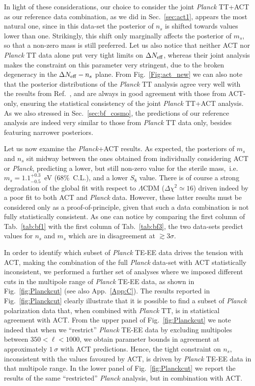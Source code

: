 \documentclass[a4paper,11pt]{article}
\begin{document}
In light of these considerations, our choice to {consider} the joint \emph{Planck} TT+ACT as our reference {data combination}, as we did in Sec.~\ref{sec:act1}, appears the most natural one, since in this data-set the posterior of $n_s$ is shifted towards values lower than one. Strikingly, this shift only marginally affects the posterior of $m_s$, so that a non-zero mass is still preferred.
Let us also notice that neither ACT nor \emph{Planck} TT data alone put very tight limits on $\Delta N_{\rm{eff}}$, whereas their joint analysis makes the constraint on this parameter very stringent, due to the broken degeneracy in the $\Delta N_{\rm{eff}}-n_s$ plane.
{From Fig.~\ref{Fig:act_new}} we can also note that the posterior distributions of the \emph{Planck} TT analysis agree very well with the results from Ref.~\cite{Archidiacono:2020yey}, and are always in good agreement with those from ACT-only, ensuring the statistical consistency of the joint \emph{Planck} TT+ACT analysis. As we also stressed in Sec.~\ref{sec:bf_cosmo}, the predictions of our reference analysis are indeed very similar to those from \emph{Planck} TT data only, besides featuring narrower posteriors.

Let us now examine the \emph{Planck}+ACT results. As expected, the posteriors of $m_s$ and $n_s$ sit midway between the ones obtained from individually considering ACT or \emph{Planck}, predicting a lower, but still non-zero value for the sterile mass,~i.e.~$m_s=1.1^{+0.3}_{-0.5}$~eV (68\%~C.L.), and a lower $S_8$ value.
There is of course a strong degradation of the global fit with respect to $\Lambda$CDM ($\Delta \chi^2 \simeq 16$)
driven indeed by a poor fit to both ACT and \emph{Planck} data.
However, these latter results must be considered only as a proof-of-principle, given that such a data combination is not fully statistically consistent.
As one can notice by comparing the first column of Tab.~\ref{tab:bf1} with the first column of Tab.~\ref{tab:bf3}, the two data-sets predict values for $n_s$ and $m_s$ which are in disagreement at $\gtrsim 3\sigma$.


In order to identify which subset of \textit{Planck} TE-EE data drives the tension with ACT, making the combination of the full \emph{Planck} data-set with ACT statistically inconsistent, we performed a further set of analyses where we imposed different cuts in the multipole range of \emph{Planck} TE-EE data, as shown in Fig.~\ref{fig:Planckcut} (see also App.~\ref{App:C}).
The results reported in Fig.~\ref{fig:Planckcut} clearly illustrate that it is possible to find a subset of \textit{Planck} polarization data that, when combined with \emph{Planck} TT, is in statistical agreement with ACT. 
From the upper panel of Fig.~\ref{fig:Planckcut} we note indeed that when we ``restrict'' \emph{Planck} TE-EE data by excluding multipoles between $350 < \ell < 1000$, we obtain parameter bounds in agreement at approximately $1~\sigma$ with ACT predictions. 
Hence, the tight constraint on $n_s$, inconsistent with the values favoured by ACT, is driven by \emph{Planck} TE-EE data in that multipole range. 
In the lower panel of Fig.~\ref{fig:Planckcut} we report the results of the same ``restricted'' \emph{Planck} analysis, but in combination with ACT.
\end{document}
